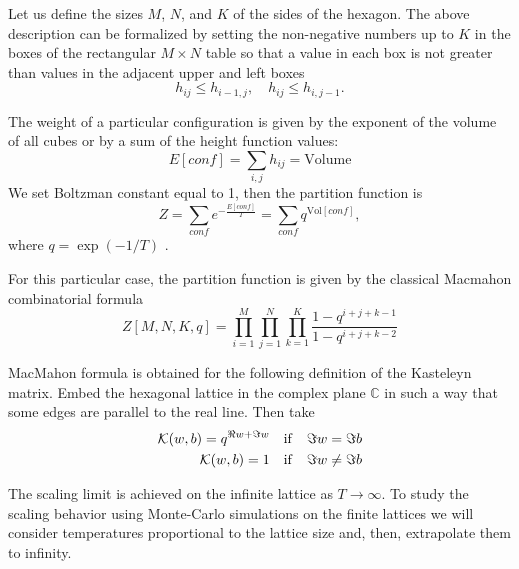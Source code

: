 \documentclass{article}
\newcommand{\gf}{\mathfrak{g}}
\begin{document}
Let us define the sizes $M$, $N$, and $K$ of the sides of the hexagon.
The above description can be formalized by
setting the non-negative numbers up to $K$ in the boxes of the rectangular $M\times N$ table so that a value in
each box is not greater than values in the adjacent upper and left boxes
\begin{equation}
  \label{eq:1}
  h_{ij}\leq h_{i-1,j},\quad h_{ij}\leq h_{i,j-1}.
\end{equation}

The weight of a particular configuration is given by the exponent of the volume of all cubes or by a
sum of the height function values:
\begin{equation*}
  \label{eq:10}
  E[conf]=\sum_{i,j} h_{ij}=\mathrm{Volume}
\end{equation*}
We set Boltzman constant equal to 1, then the partition function is 
\begin{equation*}
  \label{eq:14}
  Z=\sum_{conf} e^{-\frac{E[conf]}{T}}=\sum_{conf}q^{\mathrm{Vol}[conf]}, 
\end{equation*}
where $q=\exp\left(-1/T\right)$ .

For this particular case, the partition function is given by the classical Macmahon combinatorial
formula~\cite{vuletic2009generalization}
\begin{equation}
  \label{eq:12}
   Z[M,N,K,q]=\prod_{i=1}^{M}\prod_{j=1}^{N}\prod_{k=1}^{K}\frac{1-q^{i+j+k-1}}{1-q^{i+j+k-2}}
\end{equation}


MacMahon formula is obtained for the following definition of the Kasteleyn matrix. Embed the
hexagonal lattice in the complex plane $\mathbb{C}$ in such a way that some edges are parallel to
the real line. Then take
\begin{eqnarray}
  \label{eq:18}
  {\cal K}(w,b)=q^{\Re w+\Im w} \quad \mathrm{if}\quad \Im w=\Im b\\
  {\cal K}(w,b)=1 \quad \mathrm{if}\quad \Im w\neq\Im b
\end{eqnarray}


The scaling limit is achieved on the infinite lattice as $T\to\infty$. To study the scaling behavior
using Monte-Carlo simulations on the finite lattices we will consider temperatures proportional to
the lattice size and, then, extrapolate them to infinity.
  
  
\end{document}
